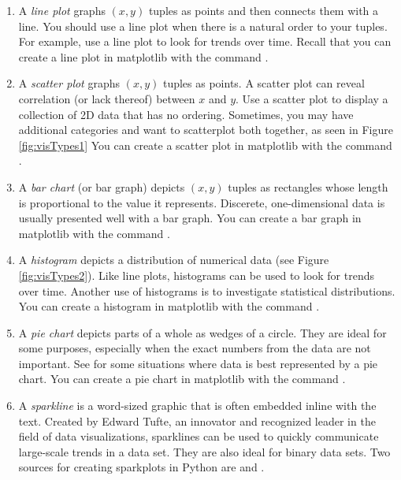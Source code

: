 \begin{enumerate}
\item A \emph{line plot} graphs $(x,y)$ tuples as points and then connects them with a line. 
You should use a line plot when there is a natural order to your tuples. 
For example, use a line plot to look for trends over time. 
Recall that you can create a line plot in matplotlib with the command .

\item A \emph{scatter plot} graphs $(x,y)$ tuples as points. 
A scatter plot can reveal correlation (or lack thereof) between $x$ and $y$. 
Use a scatter plot to display a collection of 2D data that has no ordering. Sometimes, you may have additional categories and want to scatterplot both together, as seen in Figure \ref{fig:visTypes1}
You can create a scatter plot in matplotlib with the command .

\item A \emph{bar chart} (or bar graph) depicts $(x,y)$ tuples as rectangles whose length is proportional to the value it represents. Discerete, one-dimensional data is usually presented well with a bar graph. You can create a bar graph in matplotlib with the command .

\item A \emph{histogram} depicts a distribution of numerical data (see Figure \ref{fig:visTypes2}).
Like line plots, histograms can be used to look for trends over time. 
Another use of histograms is to investigate statistical distributions. 
You can create a histogram in matplotlib with the command . 

\item A \emph{pie chart} depicts parts of a whole as wedges of a circle. 
They are ideal for some purposes, especially when the exact numbers from the data are not important. 
See \cite{piecharts} for some situations where data is best represented by a pie chart. 
You can create a pie chart in matplotlib with the command .

\item A \emph{sparkline} is a word-sized graphic that is often embedded inline with the text. 
Created by Edward Tufte, an innovator and recognized leader in the field of data visualizations, sparklines can be used to quickly communicate large-scale trends in a data set. They are also ideal for binary data sets. 
Two sources for creating sparkplots in Python are \cite{sparkplots} and \cite{sparklineshtml}.


\end{enumerate}
